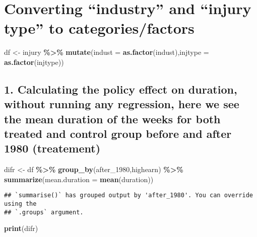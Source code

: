 \documentclass[
]{article}
\newenvironment{Shaded}{\begin{snugshade}}{\end{snugshade}}
\newcommand{\AttributeTok}[1]{\textcolor[rgb]{0.13,0.29,0.53}{#1}}
\newcommand{\FunctionTok}[1]{\textcolor[rgb]{0.13,0.29,0.53}{\textbf{#1}}}
\newcommand{\NormalTok}[1]{#1}
\newcommand{\OtherTok}[1]{\textcolor[rgb]{0.56,0.35,0.01}{#1}}
\newcommand{\SpecialCharTok}[1]{\textcolor[rgb]{0.81,0.36,0.00}{\textbf{#1}}}
\begin{document}
\section{Converting ``industry'' and ``injury type'' to
categories/factors}\label{converting-industry-and-injury-type-to-categoriesfactors}

\begin{Shaded}
\begin{Highlighting}[]
\NormalTok{df }\OtherTok{\textless{}{-}}\NormalTok{ injury }\SpecialCharTok{\%\textgreater{}\%} \FunctionTok{mutate}\NormalTok{(}\AttributeTok{indust =} \FunctionTok{as.factor}\NormalTok{(indust),}\AttributeTok{injtype =} \FunctionTok{as.factor}\NormalTok{(injtype))}
\end{Highlighting}
\end{Shaded}

\subsection{1. Calculating the policy effect on duration, without
running any regression, here we see the mean duration of the weeks for
both treated and control group before and after 1980
(treatement)}\label{calculating-the-policy-effect-on-duration-without-running-any-regression-here-we-see-the-mean-duration-of-the-weeks-for-both-treated-and-control-group-before-and-after-1980-treatement}

\begin{Shaded}
\begin{Highlighting}[]
\NormalTok{difr }\OtherTok{\textless{}{-}}\NormalTok{ df }\SpecialCharTok{\%\textgreater{}\%} \FunctionTok{group\_by}\NormalTok{(after\_1980,highearn) }\SpecialCharTok{\%\textgreater{}\%} \FunctionTok{summarize}\NormalTok{(}\AttributeTok{mean.duration =} \FunctionTok{mean}\NormalTok{(duration))}
\end{Highlighting}
\end{Shaded}

\begin{verbatim}
## `summarise()` has grouped output by 'after_1980'. You can override using the
## `.groups` argument.
\end{verbatim}

\begin{Shaded}
\begin{Highlighting}[]
\FunctionTok{print}\NormalTok{(difr)}
\end{Highlighting}
\end{Shaded}
\end{document}
